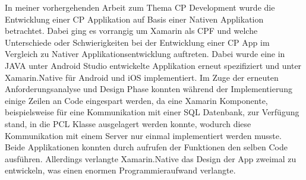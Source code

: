 In meiner vorhergehenden Arbeit zum Thema CP Development \cite{Maximilian2017} wurde die Entwicklung einer CP Applikation auf Basis einer Nativen Applikation betrachtet. Dabei ging es vorrangig um Xamarin als CPF und welche Unterschiede oder Schwierigkeiten bei der Entwicklung einer CP App im Vergleich zu Nativer Applikationsentwicklung auftreten. Dabei wurde eine in JAVA unter Android Studio entwickelte Applikation erneut spezifiziert und unter Xamarin.Native für Android und iOS implementiert. Im Zuge der erneuten Anforderungsanalyse und Design Phase konnten während der Implementierung einige Zeilen an Code eingespart werden, da eine Xamarin Komponente, beispielsweise für eine Kommunikation mit einer SQL Datenbank, zur Verfügung stand, in die PCL Klasse ausgelagert werden konnte, wodurch diese Kommunikation mit einem Server nur einmal implementiert werden musste. Beide Applikationen konnten durch aufrufen der Funktionen den selben Code ausführen. Allerdings verlangte Xamarin.Native das Design der App zweimal zu entwickeln, was einen enormen Programmieraufwand verlangte.
